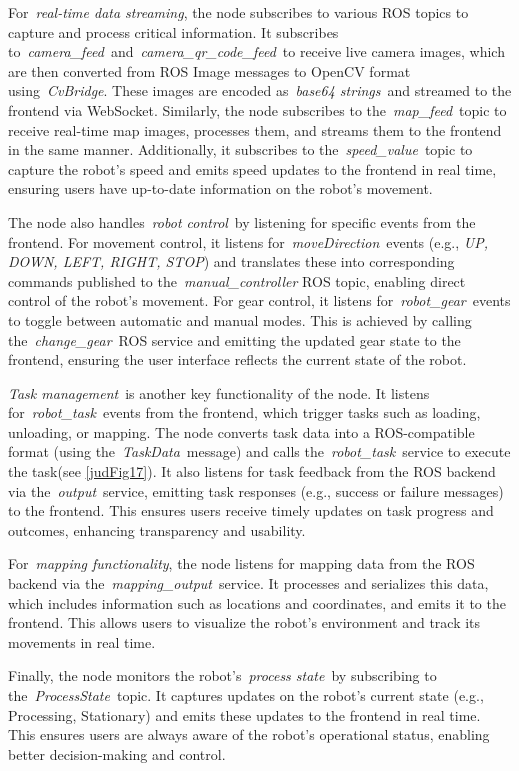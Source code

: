 \documentclass[a4paper,12pt]{extreport}
\begin{document}
For~\emph{real-time data streaming}, the node subscribes to various ROS
topics to capture and process critical information. It subscribes
to~\emph{camera\_feed}~and~\emph{camera\_qr\_code\_feed}~to receive live
camera images, which are then converted from ROS Image messages to
OpenCV format using~\emph{CvBridge}. These images are encoded
as~\emph{base64 strings}~and streamed to the frontend via WebSocket.
Similarly, the node subscribes to the~\emph{map\_feed}~topic to receive
real-time map images, processes them, and streams them to the frontend
in the same manner. Additionally, it subscribes to
the~\emph{speed\_value}~topic to capture the robot's speed and emits
speed updates to the frontend in real time, ensuring users have
up-to-date information on the robot's movement.

The node also handles~\emph{robot control}~by listening for specific
events from the frontend. For movement control, it listens
for~\emph{moveDirection}~events (e.g., \emph{UP, DOWN, LEFT, RIGHT,
STOP}) and translates these into corresponding commands published to
the~\emph{manual\_controller} ROS topic, enabling direct control of the
robot's movement. For gear control, it listens
for~\emph{robot\_gear}~events to toggle between automatic and manual
modes. This is achieved by calling the~\emph{change\_gear}~ROS service
and emitting the updated gear state to the frontend, ensuring the user
interface reflects the current state of the robot.

\emph{Task management}~is another key functionality of the node. It
listens for~\emph{robot\_task}~events from the frontend, which trigger
tasks such as loading, unloading, or mapping. The node converts task
data into a ROS-compatible format (using the~\emph{TaskData}~message)
and calls the~\emph{robot\_task}~service to execute the task(see \cref{judFig17}). It also listens for task feedback from the ROS backend via
the~\emph{output}~service, emitting task responses (e.g., success or
failure messages) to the frontend. This ensures users receive timely
updates on task progress and outcomes, enhancing transparency and
usability.

For~\emph{mapping functionality}, the node listens for mapping data from
the ROS backend via the~\emph{mapping\_output}~service. It processes and
serializes this data, which includes information such as locations and
coordinates, and emits it to the frontend. This allows users to
visualize the robot's environment and track its movements in real time.

Finally, the node monitors the robot's~\emph{process state}~by
subscribing to the~\emph{ProcessState}~topic. It captures updates on the
robot's current state (e.g., Processing, Stationary) and emits these
updates to the frontend in real time. This ensures users are always
aware of the robot's operational status, enabling better decision-making
and control.
\end{document}
